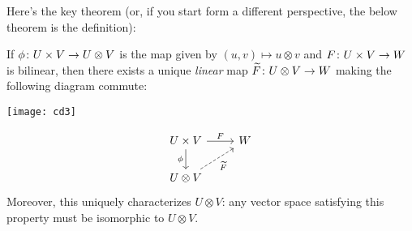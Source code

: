 Here's the key theorem (or, if you start form a different perspective, the below theorem is the definition):

\begin{theorem}\label{thm:tensor product universal property}
	If $\phi\colon\thinspace\! U \times V \to U \otimes V$ is the map given by $(u,v) \mapsto u \otimes v$ and $F \colon\thinspace\! U \times V \to W$ is bilinear, then there exists a unique \emph{linear} map $\widetilde{F} \colon\thinspace\! U \otimes V \to W$ making the following diagram commute:
	\ifplastex
		\begin{center}
			\texttt{[image: cd3]}
		\end{center}
	\else	
		\[
			\begin{tikzcd}
				U \times V \arrow[r,"F"] \arrow[d,"\phi"'] & W \\
				U \otimes V \arrow[ur,"\widetilde{F}"',dashed]
			\end{tikzcd}
		\]
	\fi
	Moreover, this uniquely characterizes $U \otimes V$: any vector space satisfying this property must be isomorphic to $U \otimes V$.
\end{theorem}

